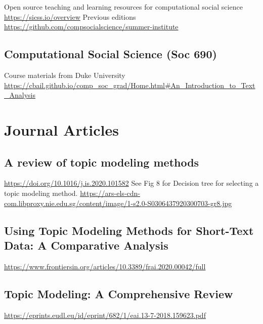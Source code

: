 \documentclass[
]{book}
\begin{document}
Open source teaching and learning resources for computational social science
\url{https://sicss.io/overview}
Previous editions
\url{https://github.com/compsocialscience/summer-institute}

\hypertarget{computational-social-science-soc-690}{%
\section{Computational Social Science (Soc 690)}\label{computational-social-science-soc-690}}

Course materials from Duke University
\url{https://cbail.github.io/comp_soc_grad/Home.html\#An_Introduction_to_Text_Analysis}

\hypertarget{journal-articles}{%
\chapter{Journal Articles}\label{journal-articles}}

\hypertarget{a-review-of-topic-modeling-methods}{%
\section{A review of topic modeling methods}\label{a-review-of-topic-modeling-methods}}

\url{https://doi.org/10.1016/j.is.2020.101582}
See Fig 8 for Decision tree for selecting a topic modeling method.
\url{https://ars-els-cdn-com.libproxy.nie.edu.sg/content/image/1-s2.0-S0306437920300703-gr8.jpg}

\hypertarget{using-topic-modeling-methods-for-short-text-data-a-comparative-analysis}{%
\section{Using Topic Modeling Methods for Short-Text Data: A Comparative Analysis}\label{using-topic-modeling-methods-for-short-text-data-a-comparative-analysis}}

\url{https://www.frontiersin.org/articles/10.3389/frai.2020.00042/full}

\hypertarget{topic-modeling-a-comprehensive-review}{%
\section{Topic Modeling: A Comprehensive Review}\label{topic-modeling-a-comprehensive-review}}

\url{https://eprints.eudl.eu/id/eprint/682/1/eai.13-7-2018.159623.pdf}
\end{document}
